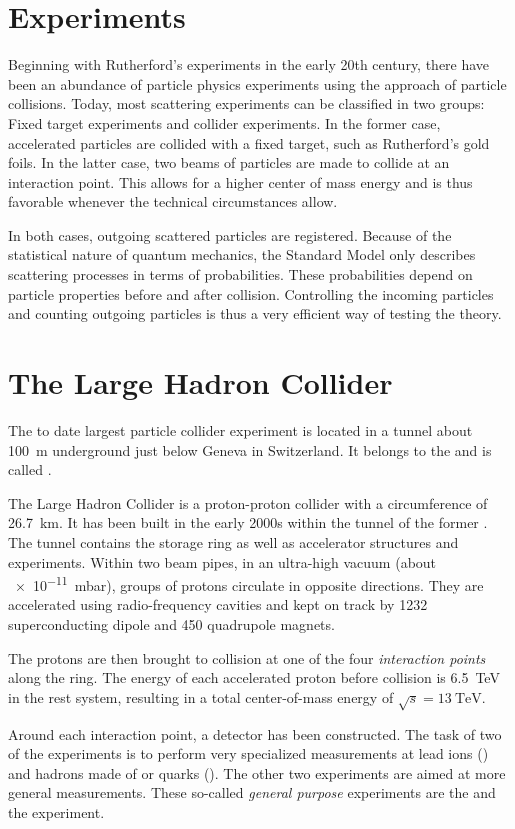\section{Experiments}
Beginning with Rutherford's experiments in the early 20th century, there have been an abundance of particle physics experiments using the approach of particle collisions. Today, most scattering experiments can be classified in two groups: Fixed target experiments and collider experiments. In the former case, accelerated particles are collided with a fixed target, such as Rutherford's gold foils. In the latter case, two beams of particles are made to collide at an interaction point. This allows for a higher center of mass energy and is thus favorable whenever the technical circumstances allow.

In both cases, outgoing scattered particles are registered. 
Because of the statistical nature of quantum mechanics, the Standard Model only describes scattering processes in terms of probabilities. These probabilities depend on particle properties before and after collision. 
Controlling the incoming particles and counting outgoing particles is thus a very efficient way of testing the theory.

\section{The Large Hadron Collider}
The to date largest particle collider experiment is located in a tunnel about \SI{100}{\m} underground just below Geneva in Switzerland. It belongs to the  and is called .

The Large Hadron Collider is a proton-proton collider with a circumference of \SI{26.7}{\km}. It has been built in the early 2000s within the tunnel of the former . The tunnel contains the storage ring as well as accelerator structures and experiments. Within two beam pipes, in an ultra-high vacuum (about \SI{e-11}{\milli\bar}), groups of protons circulate in opposite directions. They are accelerated using radio-frequency cavities and kept on track by \num{1232} superconducting dipole and \num{450} quadrupole magnets.

The protons are then brought to collision at one of the four \emph{interaction points} along the ring. The energy of each accelerated proton before collision is \SI{6.5}{\TeV} in the rest system, resulting in a total center-of-mass energy of $\sqrt{s} = \SI{13}{\TeV}$.

Around each interaction point, a detector has been constructed. The task of two of the experiments is to perform very specialized measurements at lead ions () and hadrons made of \Pcharm or \Pbottom quarks (). 
The other two experiments are aimed at more general measurements. These so-called \emph{general purpose} experiments are the  and the  experiment\cite{Evans:LHCMachine}. 

